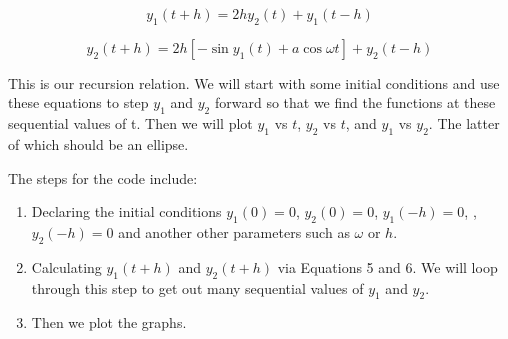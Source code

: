 \documentclass[11pt]{amsart}
\begin{document}
\begin{equation}
y_1(t+h) = 2h y_2(t) + y_1(t-h)
\end{equation}

\begin{equation}
y_2(t+h) = 2h \left[- \sin{y_1(t)}+a \cos{\omega t} \right] + y_2(t-h)
\end{equation}
\vspace{2 mm}

This is our recursion relation.  We will start with some initial conditions and use these equations to step $y_1$ and $y_2$ forward so that we find the functions at these sequential values of t.  Then we will plot $y_1$ vs $t$, $y_2$ vs $t$, and $y_1$ vs $y_2$.  The latter of which should be an ellipse. 
\newline

The steps for the code include:
\begin{enumerate}
\item  Declaring the initial conditions $y_1(0)=0$, $y_2(0)=0$, $y_1(-h)=0$, ,$y_2(-h)=0$ and another other parameters such as $\omega$ or $h$.
\item Calculating $y_1(t+h)$ and $y_2(t+h)$ via Equations 5 and 6.  We will loop through this step to get out many sequential values of $y_1$ and $y_2$.
\item Then we plot the graphs.
\end{enumerate}
\end{document}
